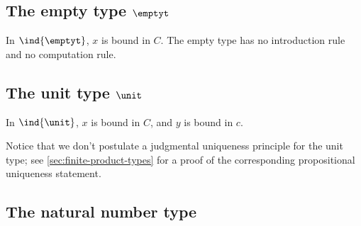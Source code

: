 \subsection{The empty type \texorpdfstring{$\emptyt$}{0}}

%

%
In $\ind{\emptyt}$, $x$ is bound in $C$. The empty type has no introduction rule and no computation rule.

%

\subsection{The unit type \texorpdfstring{$\unit$}{1}}

%

%
In $\ind{\unit}$, $x$ is bound in $C$, and $y$ is bound in $c$.

Notice that we don't postulate a judgmental uniqueness principle for the unit
type; see \autoref{sec:finite-product-types} for a proof of the corresponding
propositional uniqueness statement.

%

\subsection{The natural number type}

